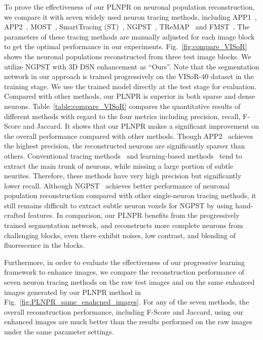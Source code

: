 To prove the effectiveness of our PLNPR on neuronal population reconstruction, we compare it with seven widely used neuron tracing methods, including APP1~\cite{Peng2011},  APP2~\cite{Xiao2013}, MOST~\cite{Wu2014}, SmartTracing (ST)~\cite{Chen2015}, NGPST~\cite{Quan2015}, TReMAP~\cite{Zhou2016} and  FMST~\cite{Yang2019}.
The parameters of these tracing methods are manually adjusted for each image block to get the optimal performance in our experiments.
%
Fig.~\ref{fig:compare_VISoR} shows the neuronal populations reconstructed from three test image blocks.
We utilize NGPST with 3D DSN enhancement as ``Ours''. Note that the segmentation network in our approach is trained progressively on the VISoR-40 dataset in the training stage. We use the trained model directly at the test stage for evaluation. 
Compared with other methods, our PLNPR is superior in both sparse and dense neurons.
%
Table~\ref{table:compare_VISoR} compares the quantitative results of different methods with regard to the four metrics including precision, recall, F-Score and Jaccard.
%
It shows that our PLNPR makes a significant improvement on the overall performance compared with other methods.
Though APP2~\cite{Xiao2013} achieves the highest precision, the reconstructed neurons are significantly sparser than others.
%
Conventional tracing methods~\cite{Peng2011, Xiao2013, Wu2014, Zhou2016} and learning-based methods~\cite{Chen2015, Yang2019} tend to extract the main trunk of neurons, while missing a large portion of subtle neurites. 
Therefore, these methods have very high precision but significantly lower recall.
Although NGPST~\cite{Quan2015} achieves better performance of neuronal population reconstruction compared with other single-neuron tracing methods, it still remains difficult to extract subtle neuron voxels for NGPST by using hand-crafted features.
%
In comparison, our PLNPR benefits from the progressively trained segmentation network, and reconstructs more complete neurons from challenging blocks, even there exhibit noises, low contrast, and blending of fluorescence in the blocks.
%


Furthermore, in order to evaluate the effectiveness of our progressive learning framework to enhance images, we compare the reconstruction performance of seven neuron tracing methods on the raw test images and on the same enhanced images  generated by our PLNPR method in Fig.~\ref{fig:PLNPR_same_enahcned_images}.
For any of the seven methods, the overall reconstruction performance, including F-Score and Jaccard, using our enhanced images are much better than the results performed on the raw images under the same parameter settings.

